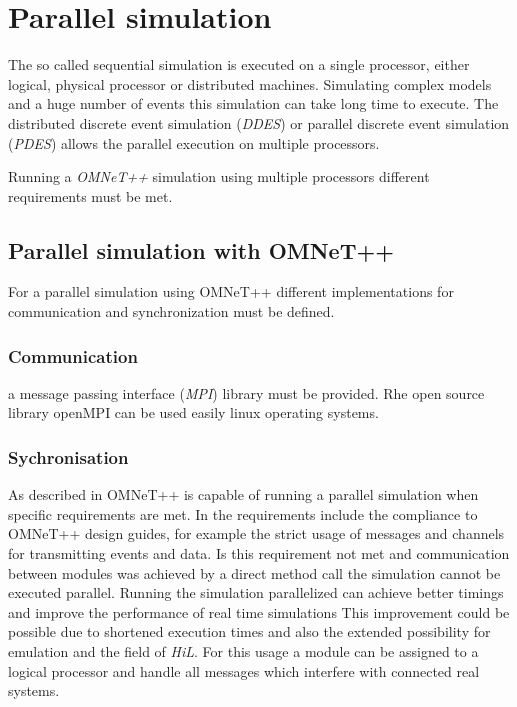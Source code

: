 \chapter{Parallel simulation}
\label{cha:parallel_sim}
The so called sequential simulation is executed on a single processor, either logical, physical processor or distributed machines.
Simulating complex models and a huge number of events this simulation can take long time to execute.
The distributed discrete event simulation (\emph{DDES}) or parallel discrete event simulation (\emph{PDES}) allows the parallel execution on multiple processors.

Running a \emph{OMNeT++} simulation using multiple processors different requirements must be met.

\section{Parallel simulation with OMNeT++}
\label{sec:parallel_omnet}

For a parallel simulation using OMNeT++ different implementations for communication and synchronization must be defined.

\subsection{Communication}
\label{sec:parallel_omnet_comm}

a message passing interface (\emph{MPI}) library must be provided.
Rhe open source library openMPI can be used easily linux operating systems.


\subsection{Sychronisation}
\label{sec:parallel_omnet_sync}

As described in \cite{varga_parallel_2003} OMNeT++ is capable of running a parallel simulation when specific requirements are met.
In \cite{varga_parallel_2003} the requirements include the compliance to OMNeT++ design guides, for example the strict usage of messages and channels for transmitting events and data.
Is this requirement not met and communication between modules was achieved by a direct method call the simulation cannot be executed parallel.
Running the simulation parallelized can achieve better timings and improve the performance of real time simulations
This improvement could be possible due to shortened execution times and also the extended possibility for emulation and the field of \emph{HiL}.
For this usage a module can be assigned to a logical processor and handle all messages which interfere with connected real systems.
